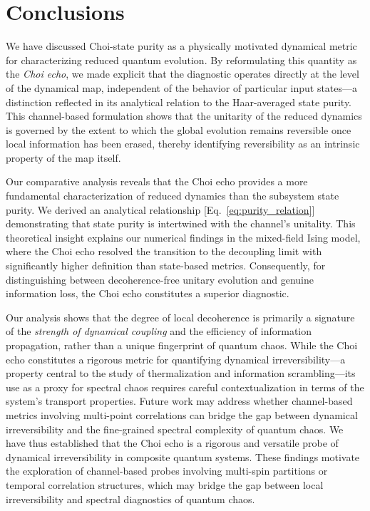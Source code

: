 \documentclass[pra,twocolumn,aps,showpacs,superscriptaddress,longbibliography]{revtex4-2}
\begin{document}
\section{Conclusions}\label{sec:conclusions}
We have discussed Choi-state purity as a physically motivated dynamical metric for characterizing reduced quantum evolution. 
By reformulating this quantity as the \textit{Choi echo}, we made explicit that the diagnostic operates directly at the level of the dynamical map, independent of the behavior of particular input states—a distinction reflected in its analytical relation to the Haar-averaged state purity. 
This channel-based formulation shows that the unitarity of the reduced dynamics is governed by the extent to which the global evolution remains reversible once local information has been erased, thereby identifying reversibility as an intrinsic property of the map itself.

Our comparative analysis reveals that the Choi echo provides a more fundamental characterization of reduced dynamics than the subsystem state purity. We derived an analytical relationship [Eq.~\eqref{eq:purity_relation}] demonstrating that state purity is intertwined with the channel's unitality. This theoretical insight explains our numerical findings in the mixed-field Ising model, where the Choi echo resolved the transition to the decoupling limit with significantly higher definition than state-based metrics. Consequently, for distinguishing between decoherence-free unitary evolution and genuine information loss, the Choi echo constitutes a superior diagnostic.

Our analysis shows that the degree of local decoherence is primarily a signature of the \textit{strength of dynamical coupling} and the efficiency of information propagation, rather than a unique fingerprint of quantum chaos. While the Choi echo constitutes a rigorous metric for quantifying dynamical irreversibility---a property central to the study of thermalization and information scrambling---its use as a proxy for spectral chaos requires careful contextualization in terms of the system's transport properties. Future work may address whether channel-based metrics involving multi-point correlations can bridge the gap between dynamical irreversibility and the fine-grained spectral complexity of quantum chaos.
We have thus established that the Choi echo is a rigorous and versatile probe of dynamical irreversibility in composite quantum systems. These findings motivate the exploration of channel-based probes involving multi-spin partitions or temporal correlation structures, which may bridge the gap between local irreversibility and spectral diagnostics of quantum chaos.
\end{document}
